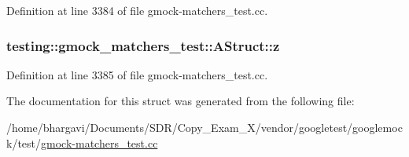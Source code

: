 Definition at line 3384 of file gmock-\/matchers\+\_\+test.\+cc.

\subsubsection[{\texorpdfstring{z}{z}}]{ testing\+::gmock\+\_\+matchers\+\_\+test\+::\+A\+Struct\+::z}\hypertarget{structtesting_1_1gmock__matchers__test_1_1_a_struct_a45b1006e4a7b21037610a385dcae6d8c}{}\label{structtesting_1_1gmock__matchers__test_1_1_a_struct_a45b1006e4a7b21037610a385dcae6d8c}


Definition at line 3385 of file gmock-\/matchers\+\_\+test.\+cc.



The documentation for this struct was generated from the following file\+:\begin{DoxyCompactItemize}
\item 
/home/bhargavi/\+Documents/\+S\+D\+R/\+Copy\+\_\+\+Exam\+\_\+X/vendor/googletest/googlemock/test/\hyperlink{gmock-matchers__test_8cc}{gmock-\/matchers\+\_\+test.\+cc}\end{DoxyCompactItemize}
